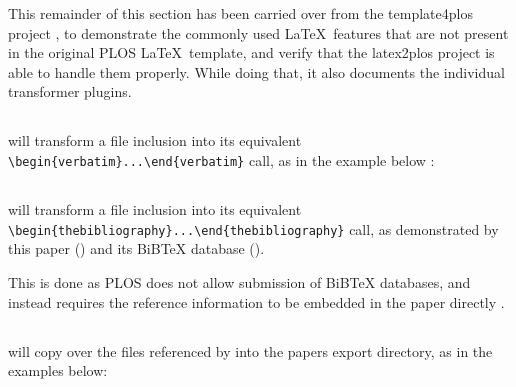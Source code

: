 This remainder of this section has been carried over from the template4plos project \cite{template4plos}, to demonstrate the commonly used \LaTeX~features that are not present in the original PLOS \LaTeX~template, and verify that the latex2plos project is able to handle them properly.
While doing that, it also documents the individual transformer plugins.

\subsection*{}

 will transform a \verb|| file inclusion into its equivalent \verb|\begin{verbatim}...\end{verbatim}| call, as in the example below \cite{Project:friendly_name_mixin:CodeRepository}:



\subsection*{}

 will transform a \verb|| file inclusion into its equivalent \verb|\begin{thebibliography}...\end{thebibliography}| call, as demonstrated by this paper () and its BiBTeX database ().

This is done as PLOS does not allow submission of BiBTeX databases, and instead requires the reference information to be embedded in the paper directly \cite{PLOS:LaTeX}.

\subsection*{}

 will copy over the files referenced by \verb|| into the papers export directory, as in the examples below:



